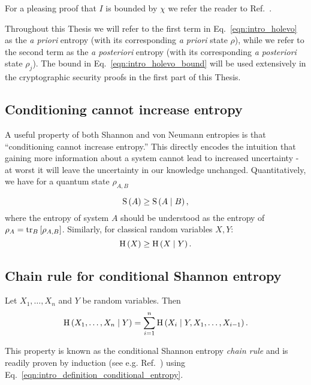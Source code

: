 \noindent For a pleasing proof that $I$ is bounded by $\chi$ we refer the reader to Ref.~\cite{Nielsen2010}. 

Throughout this Thesis we will refer to the first term in Eq.~\ref{eqn:intro_holevo} as the \emph{a priori} entropy (with its corresponding \emph{a priori} state $\rho$), while we refer to the second term as the \emph{a  posteriori} entropy (with its corresponding \emph{a posteriori} state $\rho_j$). The bound in Eq.~\ref{eqn:intro_holevo_bound} will be used extensively in the cryptographic security proofs in the first part of this Thesis.


\FloatBarrier
\subsection{Conditioning cannot increase entropy}

A useful property of both Shannon and von Neumann entropies is that ``conditioning cannot increase entropy.'' This directly encodes the intuition that gaining more information about a system cannot lead to increased uncertainty - at worst it will leave the uncertainty in our knowledge unchanged. Quantitatively, we have for a quantum state $\rho_{A, B}$

\begin{equation}
\text{S}\left(A\right) \ge \text{S}\left( A \; \middle| \; B \right),
\end{equation}
where the entropy of system $A$ should be understood as the entropy of $\rho_A = \tr_B\left[\rho_{A, B}\right]$. Similarly, for classical random variables $X, Y$:
\begin{equation}
\text{H}\left(X\right) \ge \text{H}\left(X \; \middle| \; Y\right).
\end{equation}


\FloatBarrier
\subsection{Chain rule for conditional Shannon entropy}

Let $X_1, \dots, X_n$ and $Y$ be random variables. Then \cite{Nielsen2010, Wilde2013}
\begin{equation}\label{eqn:intro_chain_rule}
\text{H}\left(X_1, \dots, X_n \; \middle| \; Y\right) = \sum_{i=1}^n \text{H}\left(X_i \; \middle| \; Y, X_1, \dots, X_{i-1}\right).
\end{equation}

\noindent This property is known as the conditional Shannon entropy \emph{chain rule} and is readily proven by induction (see e.g. Ref.~\cite{Nielsen2010}) using Eq.~\ref{eqn:intro_definition_conditional_entropy}.


